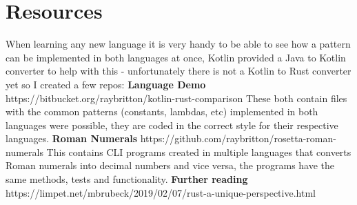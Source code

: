 \documentclass[a4paper,11pt]{article}
\begin{document}
\newpage
\section{Resources}

When learning any new language it is very handy to be able to see how a pattern can be implemented in both languages at once, Kotlin provided a Java to Kotlin converter to help with this - unfortunately there is not a Kotlin to Rust converter yet so I created a few repos:
\medskip
\newline
\textbf{Language Demo}
\newline
https://bitbucket.org/raybritton/kotlin-rust-comparison
\newline
These both contain files with the common patterns (constants, lambdas, etc) implemented in both languages were possible, they are coded in the correct style for their respective languages. 
\newline
\newline
\textbf{Roman Numerals}
\newline
https://github.com/raybritton/rosetta-roman-numerals
\newline
This contains CLI programs created in multiple languages that converts Roman numerals into decimal numbers and vice versa, the programs have the same methods, tests and functionality.
\medskip
\medskip
\newline
\textbf{Further reading}
\newline
https://limpet.net/mbrubeck/2019/02/07/rust-a-unique-perspective.html
\end{document}
